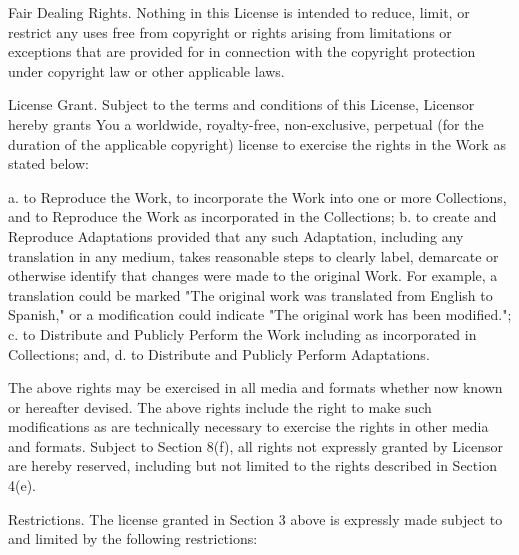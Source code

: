 \item
Fair Dealing Rights. Nothing in this License is intended to reduce,
limit, or restrict any uses free from copyright or rights arising from
limitations or exceptions that are provided for in connection with the
copyright protection under copyright law or other applicable laws.

\item
License Grant. Subject to the terms and conditions of this License,
Licensor hereby grants You a worldwide, royalty-free, non-exclusive,
perpetual (for the duration of the applicable copyright) license to
exercise the rights in the Work as stated below:

 a. to Reproduce the Work, to incorporate the Work into one or more
    Collections, and to Reproduce the Work as incorporated in the
    Collections;
 b. to create and Reproduce Adaptations provided that any such Adaptation,
    including any translation in any medium, takes reasonable steps to
    clearly label, demarcate or otherwise identify that changes were made
    to the original Work. For example, a translation could be marked "The
    original work was translated from English to Spanish," or a
    modification could indicate "The original work has been modified.";
 c. to Distribute and Publicly Perform the Work including as incorporated
    in Collections; and,
 d. to Distribute and Publicly Perform Adaptations.

The above rights may be exercised in all media and formats whether now
known or hereafter devised. The above rights include the right to make
such modifications as are technically necessary to exercise the rights in
other media and formats. Subject to Section 8(f), all rights not expressly
granted by Licensor are hereby reserved, including but not limited to the
rights described in Section 4(e).

\item
Restrictions. The license granted in Section 3 above is expressly made
subject to and limited by the following restrictions:

